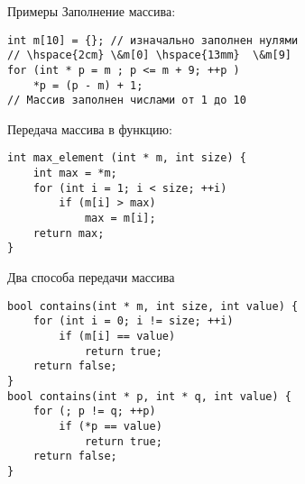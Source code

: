\documentclass{beamer}
\begin{document}
\begin{frame}[fragile]{Примеры}
Заполнение массива:
\begin{lstlisting}
int m[10] = {}; // изначально заполнен нулями
// \hspace{2cm} \&m[0] \hspace{13mm}  \&m[9]
for (int * p = m ; p <= m + 9; ++p )
    *p = (p - m) + 1;    
// Массив заполнен числами от 1 до 10
\end{lstlisting}
Передача массива в функцию:
\begin{lstlisting} 
int max_element (int * m, int size) {
    int max = *m; 
    for (int i = 1; i < size; ++i)
        if (m[i] > max)
            max = m[i];
    return max;
}
\end{lstlisting}
\end{frame}


\begin{frame}[fragile]{Два способа передачи массива}
\small
\begin{lstlisting}
bool contains(int * m, int size, int value) {
    for (int i = 0; i != size; ++i)
        if (m[i] == value)
            return true;
    return false;
}
bool contains(int * p, int * q, int value) {
    for (; p != q; ++p)
        if (*p == value)
            return true;
    return false;
}
\end{lstlisting}
\begin{center}
\end{center}
\end{frame}
\end{document}
